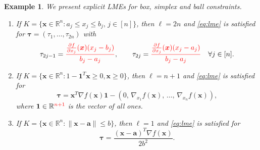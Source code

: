 \documentclass[pdflatex,sn-mathphys-num]{sn-jnl}%
\newcommand{\re}{\mathbb{R}}
\newcommand{\rd}[1]{{\color{red}#1}}
\newcommand{\vect}[1]{\boldsymbol{#1}}
\theoremstyle{thmstyleone}%
\theoremstyle{thmstyletwo}%
\newtheorem{example}{Example}%
\theoremstyle{thmstylethree}%
\begin{document}
\begin{example}\label{ex:lmes}
	We present explicit LMEs for box, simplex and ball constraints.
	
	\begin{enumerate}
		
		\item[(i)] If $K=\{\vect{x}\in\re^n: a_j \leq x_j \leq b_j,\, j\in[n]\}$, 
		then $\ell = 2n$ and \eqref{eq:lme} is satisfied for 
		$\vect{\tau} = (\tau_1,\ldots,\tau_{2n})$ with
		\begin{equation*}
			\tau_{2j-1} = \rd{\frac{\frac{\partial f}{\partial x_j}(\vect{x})(x_j-b_j)}
			{b_j-a_j}},\qquad
			\tau_{2j} = \rd{\frac{\frac{\partial f}{\partial x_j}(\vect{x})(x_j-a_j)}
			{b_j-a_j}}\quad
			\forall j\in[n].
		\end{equation*}
		
		\item[(ii)] If $K=\{\vect{x}\in\re^n: 1 - \mathbf{1}^T \vect{x} \ge 0,\vect{x} \geq 0\}$,
		then $\ell = n+1$ and \eqref{eq:lme} is satisfied for 
		\[
		\vect{\tau} = \vect{x}^T\nabla f(\vect{x})\mathbf{1}
		- (0,\, \nabla_{x_1} f(\vect{x}),
		\, \ldots,\, \nabla_{x_n} f(\vect{x})),
		\]
		where $\mathbf{1}\in\re^{\rd{n+1}}$ is the vector of all ones.
		
		\item[(iii)] If $K = \{\vect{x}\in\re^n: \|\vect{x}-\vect{a}\| \leq b\}$, 
		then $\ell=1$ and \eqref{eq:lme} is satisfied for
		\begin{equation*}
			\vect{\tau}
			= \frac{(\vect{x}-\vect{a})^T \nabla f(\vect{x})}{2b^2}.
		\end{equation*}
		
	\end{enumerate}
\end{example}
\end{document}
